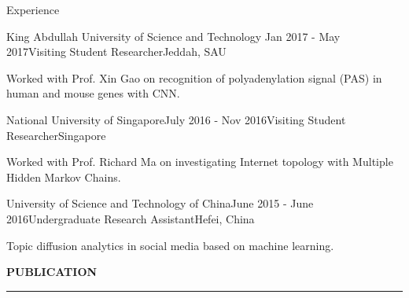 \documentclass{resume} %
\begin{document}
\begin{rSection}{Experience}
\begin{rSubsection}{King Abdullah University of Science and Technology }{Jan 2017 - May 2017}{Visiting Student Researcher}{Jeddah, SAU}
\item Worked with Prof. Xin Gao on recognition of polyadenylation signal (PAS) in human and mouse genes with CNN.
\end{rSubsection}


\begin{rSubsection}{National University of Singapore}{July 2016 - Nov 2016}{Visiting Student Researcher}{Singapore}
\item Worked with Prof. Richard Ma on investigating Internet topology with Multiple Hidden Markov Chains.
\end{rSubsection}


\begin{rSubsection}{University of Science and Technology of China}{June 2015 - June 2016}{Undergraduate Research Assistant}{Hefei, China}
\item Topic diffusion analytics in social media based on machine learning.
\end{rSubsection}

\end{rSection}

\clearpage

\sectionskip
\MakeUppercase{\bf Publication} %
\sectionlineskip
\hrule %
\end{document}
